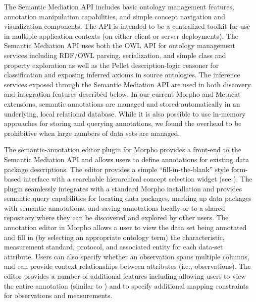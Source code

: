  The Semantic Mediation API
includes basic ontology management features, annotation manipulation
capabilities, and simple concept navigation and visualization
components. The API is intended to be a centralized toolkit for use in
multiple application contexts (on either client or server
deployments).  The Semantic Mediation API uses both the OWL API
\cite{owlapi} for ontology management services including RDF/OWL
parsing, serialization, and simple class and property exploration as
well as the Pellet description-logic reasoner \cite{pellet} for
classification and exposing inferred axioms in source ontologies. The
inference services exposed through the Semantic Mediation API are used
in both discovery and integration features described below.
In our current Morpho and Metacat extensions, semantic annotations are
managed and stored automatically in an underlying, local relational
database. While it is also possible to use in-memory approaches for
storing and querying annotations, we found the overhead to be
prohibitive when large numbers of data sets are managed.




  The semantic-annotation editor
plugin for Morpho provides a front-end to the Semantic Mediation API
and allows users to define annotations for existing data package
descriptions. The editor provides a simple ``fill-in-the-blank'' style
form-based interface with a searchable hierarchical concept selection
widget (see ). The plugin seamlessly
integrates with a standard Morpho installation and provides semantic
query capabilities for locating data packages, marking up data
packages with semantic annotations, and saving annotations locally or
to a shared repository where they can be discovered and explored by
other users. The annotation editor in Morpho allows a user to view the
data set being annotated and fill in (by selecting an appropriate
ontology term) the characteristic, measurement standard, protocol, and
associated entity for each data-set attribute. Users can also specify
whether an observation spans multiple columns, and can provide context
relationships between attributes (i.e., observations). The editor
provides a number of additional features including allowing users to
view the entire annotation (similar to )
and to specify additional mapping constraints for observations and
measurements.

